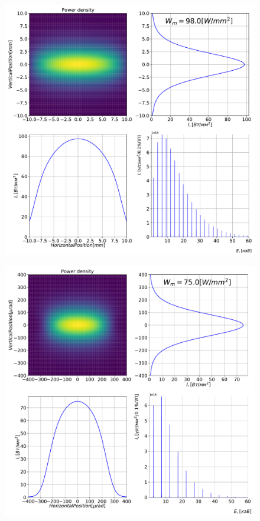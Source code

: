 \documentclass[14pt, hyperref = {colorlinks},xcolor=table ]{beamer}
\begin{document}
\small
\begin{frame}
	\begin{figure}[h]
		\vspace{-10pt}
		\center\includegraphics[width=0.7\linewidth]{pic/power_dens_1-1.pdf}
		\vspace{-20pt}
		\tiny{}
	\end{figure}
\end{frame}

\small
\begin{frame}
	\begin{figure}[h]
		\vspace{-10pt}
		\center\includegraphics[width=0.7\linewidth]{pic/power_dens_1-2.pdf}
		\vspace{-20pt}
		\tiny{}
	\end{figure}
\end{frame}
\end{document}
